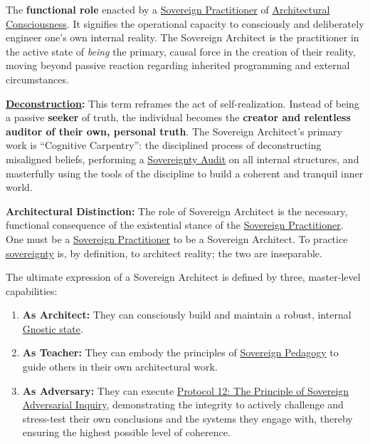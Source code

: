 \item[\hypertarget{gloss:sovereign_architect}{Sovereign Architect}]
    The \textbf{functional role} enacted by a \hyperlink{gloss:sovereign_practitioner}{Sovereign Practitioner} of \hyperlink{gloss:architectural_consciousness}{Architectural Consciousness}. It signifies the operational capacity to consciously and deliberately engineer one's own internal reality. The Sovereign Architect is the practitioner in the active state of \textit{being} the primary, causal force in the creation of their reality, moving beyond passive reaction regarding inherited programming and external circumstances.
    \begin{nobullet}
        \item \textbf{\hyperlink{gloss:deconstruction}{Deconstruction}:} This term reframes the act of self-realization. Instead of being a passive \textbf{seeker} of truth, the individual becomes the \textbf{creator and relentless auditor of their own, personal truth}. The Sovereign Architect's primary work is ``Cognitive Carpentry'': the disciplined process of deconstructing misaligned beliefs, performing a \hyperlink{gloss:sovereignty_audit}{Sovereignty Audit} on all internal structures, and masterfully using the tools of the discipline to build a coherent and tranquil inner world.
        
        \item \textbf{Architectural Distinction:} The role of Sovereign Architect is the necessary, functional consequence of the existential stance of the \hyperlink{gloss:sovereign_practitioner}{Sovereign Practitioner}. One must be a \hyperlink{gloss:sovereign_practitioner}{Sovereign Practitioner} to be a Sovereign Architect. To practice \hyperlink{gloss:sovereignty}{sovereignty} is, by definition, to architect reality; the two are inseparable.
        
        \item The ultimate expression of a Sovereign Architect is defined by three, master-level capabilities:
        \begin{enumerate}
            \item \textbf{As Architect:} They can consciously build and maintain a robust, internal \hyperlink{gloss:gnostic_state}{Gnostic state}.
            \item \textbf{As Teacher:} They can embody the principles of \hyperlink{gloss:sovereign_pedagogy}{Sovereign Pedagogy} to guide others in their own architectural work.
            \item \textbf{As Adversary:} They can execute \hyperref[protocol_12_the_principle_of_sovereign_adversarial_inquiry]{Protocol 12: The Principle of Sovereign Adversarial Inquiry}, demonstrating the integrity to actively challenge and stress-test their own conclusions and the systems they engage with, thereby ensuring the highest possible level of coherence.
        \end{enumerate}
    \end{nobullet}


